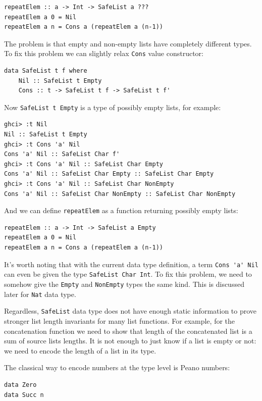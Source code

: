 \documentclass{tmr}
\begin{document}
\begin{Verbatim}
repeatElem :: a -> Int -> SafeList a ???
repeatElem a 0 = Nil
repeatElem a n = Cons a (repeatElem a (n-1))
\end{Verbatim}

The problem is that empty and non-empty lists have completely different types. To fix this problem we can slightly relax \verb|Cons| value constructor:

\begin{Verbatim}
data SafeList t f where
    Nil :: SafeList t Empty
    Cons :: t -> SafeList t f -> SafeList t f'
\end{Verbatim}

Now \verb|SafeList t Empty| is a type of possibly empty lists, for example:

\begin{Verbatim}
ghci> :t Nil
Nil :: SafeList t Empty
ghci> :t Cons 'a' Nil
Cons 'a' Nil :: SafeList Char f'
ghci> :t Cons 'a' Nil :: SafeList Char Empty
Cons 'a' Nil :: SafeList Char Empty :: SafeList Char Empty
ghci> :t Cons 'a' Nil :: SafeList Char NonEmpty
Cons 'a' Nil :: SafeList Char NonEmpty :: SafeList Char NonEmpty
\end{Verbatim}

And we can define \verb|repeatElem| as a function returning possibly empty lists:

\begin{Verbatim}
repeatElem :: a -> Int -> SafeList a Empty
repeatElem a 0 = Nil
repeatElem a n = Cons a (repeatElem a (n-1))
\end{Verbatim}

It's worth noting that with the current data type definition, a term \verb|Cons 'a' Nil| can even be given the type \verb|SafeList Char Int|. To fix this problem, we need to somehow give the \verb|Empty| and \verb|NonEmpty| types the same kind. This is discussed later for \verb|Nat| data type.

Regardless, \verb|SafeList| data type does not have enough static information to prove stronger list length invariants for many list functions. For example, for the concatenation function we need to show that length of the concatenated list is a sum of source lists lengths. It is not enough to just know if a list is empty or not: we need to encode the length of a list in its type.

The classical way to encode numbers at the type level is Peano numbers:

\begin{Verbatim}
data Zero
data Succ n
\end{Verbatim}
\end{document}
